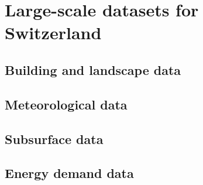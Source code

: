 \chapter{Large-scale datasets for Switzerland}
\label{data}

\section{Building and landscape data}

\section{Meteorological data}

\section{Subsurface data}

\section{Energy demand data}
